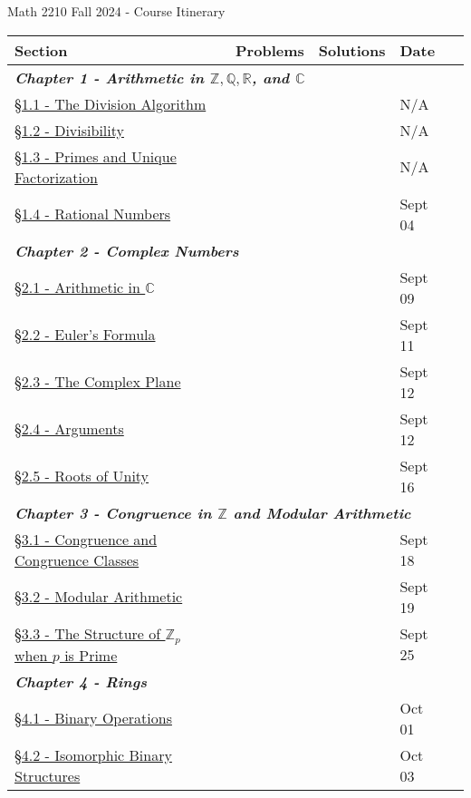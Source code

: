\documentclass{article}
\newcommand{\chaptercolor}{RoyalBlue!35}
\begin{document}
\large
\begin{center}
{\Huge Math 2210 Fall 2024 - Course Itinerary}
\vspace{0.25cm}

\begin{tabular}{|l|l|l|l|l|l|}
\cellcolor{black!85}\color{white}Section & \cellcolor{black!85}\color{white}\phantom{-----------} & \cellcolor{black!85}\color{white}Problems & \cellcolor{black!85}\color{white}Solutions & \cellcolor{black!85}\color{white}Date\\
%
\hline
%
\multicolumn{5}{|l|}{\cellcolor{\chaptercolor} \textit{\textbf{Chapter 1 - Arithmetic in $\mathbb{Z}, \mathbb{Q}, \mathbb{R}$, and $\mathbb{C}$}}}\\
\hline
\href{}{\S1.1 - The Division Algorithm} & & & & \phantom{--}N/A\\
\href{}{\S1.2 - Divisibility} & & & & \phantom{--}N/A\\
\href{}{\S1.3 - Primes and Unique Factorization} & & & & \phantom{--}N/A\\
\href{}{\S1.4 - Rational Numbers} & & & & Sept 04\\
\hline
\multicolumn{5}{|l|}{\cellcolor{\chaptercolor} \textit{\textbf{Chapter 2 - Complex Numbers}}}\\
\hline
\href{}{\S2.1 - Arithmetic in $\mathbb{C}$} & & & & Sept 09\\
\href{}{\S2.2 - Euler's Formula} & & & & Sept 11\\
\href{}{\S2.3 - The Complex Plane} & & & & Sept 12\\
\href{}{\S2.4 - Arguments} & & & & Sept 12\\
\href{}{\S2.5 - Roots of Unity} & & & & Sept 16\\
\hline
\multicolumn{5}{|l|}{\cellcolor{\chaptercolor} \textit{\textbf{Chapter 3 - Congruence in $\mathbb{Z}$ and Modular Arithmetic}}}\\
\hline
\href{}{\S3.1 - Congruence and Congruence Classes} & & & & Sept 18\\
\href{}{\S3.2 - Modular Arithmetic} & & & & Sept 19\\
\href{}{\S3.3 - The Structure of $\mathbb{Z}_{p}$ when $p$ is Prime} & & & & Sept 25\\
\hline
\multicolumn{5}{|l|}{\cellcolor{\chaptercolor} \textit{\textbf{Chapter 4 - Rings}}}\\
\hline
\href{}{\S4.1 - Binary Operations} & & & & Oct 01\\
\href{}{\S4.2 - Isomorphic Binary Structures} & & & & Oct 03\\

\end{tabular}
\end{center}
\end{document}
